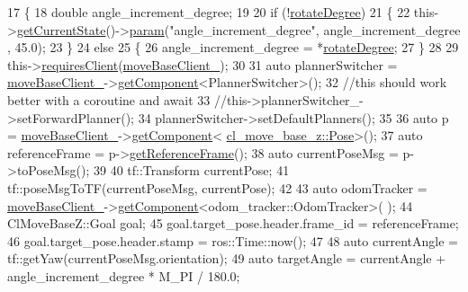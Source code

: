 \begin{DoxyCode}
17 \{
18     \textcolor{keywordtype}{double} angle\_increment\_degree;
19 
20     \textcolor{keywordflow}{if} (!\hyperlink{classcl__move__base__z_1_1CbRotate_a83e9f97e917044f919c98a55d8e00db6}{rotateDegree})
21     \{
22         this->\hyperlink{classsmacc_1_1SmaccClientBehavior_abf6773e4dd948f932f11a346dd6e7c2c}{getCurrentState}()->\hyperlink{classsmacc_1_1ISmaccState_a4982f2187ed6da337462721146e8ef70}{param}(\textcolor{stringliteral}{"angle\_increment\_degree"}, angle\_increment\_degree
      , 45.0);
23     \}
24     \textcolor{keywordflow}{else}
25     \{
26         angle\_increment\_degree = *\hyperlink{classcl__move__base__z_1_1CbRotate_a83e9f97e917044f919c98a55d8e00db6}{rotateDegree};
27     \}
28 
29     this->\hyperlink{classsmacc_1_1SmaccClientBehavior_a917f001e763a1059af337bf4e164f542}{requiresClient}(\hyperlink{classcl__move__base__z_1_1CbRotate_a390623f5bcbdad18fe2a65428e4621cb}{moveBaseClient\_});
30 
31     \textcolor{keyword}{auto} plannerSwitcher = \hyperlink{classcl__move__base__z_1_1CbRotate_a390623f5bcbdad18fe2a65428e4621cb}{moveBaseClient\_}->\hyperlink{classsmacc_1_1ISmaccClient_adef78db601749ca63c19e74a27cb88cc}{getComponent}<PlannerSwitcher>();
32     \textcolor{comment}{//this should work better with a coroutine and await}
33     \textcolor{comment}{//this->plannerSwitcher\_->setForwardPlanner();}
34     plannerSwitcher->setDefaultPlanners();
35 
36     \textcolor{keyword}{auto} p = \hyperlink{classcl__move__base__z_1_1CbRotate_a390623f5bcbdad18fe2a65428e4621cb}{moveBaseClient\_}->\hyperlink{classsmacc_1_1ISmaccClient_adef78db601749ca63c19e74a27cb88cc}{getComponent}<
      \hyperlink{classcl__move__base__z_1_1Pose}{cl\_move\_base\_z::Pose}>();
37     \textcolor{keyword}{auto} referenceFrame = p->\hyperlink{classcl__move__base__z_1_1Pose_aaef18a35d7698fcbf6712149eead8e8d}{getReferenceFrame}();
38     \textcolor{keyword}{auto} currentPoseMsg = p->toPoseMsg();
39 
40     tf::Transform currentPose;
41     tf::poseMsgToTF(currentPoseMsg, currentPose);
42 
43     \textcolor{keyword}{auto} odomTracker = \hyperlink{classcl__move__base__z_1_1CbRotate_a390623f5bcbdad18fe2a65428e4621cb}{moveBaseClient\_}->\hyperlink{classsmacc_1_1ISmaccClient_adef78db601749ca63c19e74a27cb88cc}{getComponent}<odom\_tracker::OdomTracker>(
      );
44     ClMoveBaseZ::Goal goal;
45     goal.target\_pose.header.frame\_id = referenceFrame;
46     goal.target\_pose.header.stamp = ros::Time::now();
47 
48     \textcolor{keyword}{auto} currentAngle = tf::getYaw(currentPoseMsg.orientation);
49     \textcolor{keyword}{auto} targetAngle = currentAngle + angle\_increment\_degree * M\_PI / 180.0;

\end{DoxyCode}
